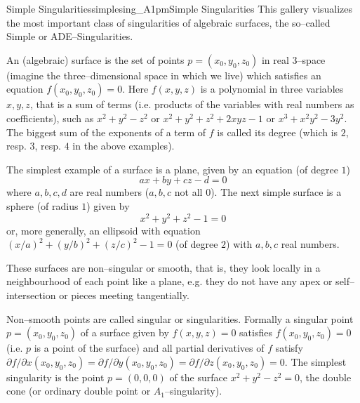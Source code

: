 \begin{surferIntroPage}{Simple Singularities}{simplesing_A1pm}{Simple Singularities}
This gallery visualizes the most important class of singularities of algebraic surfaces, the so--called Simple or ADE--Singularities.

An (algebraic) surface is the set of points $p=(x_0, y_0, z_0)$ in real $3$--space (imagine the three--dimensional space in which we live) which satisfies an equation $f(x_0, y_0, z_0)=0$. Here $f(x,y,z)$ is a polynomial in three variables $x,y,z$, that is a sum of terms (i.e. products of the variables with real numbers as coefficients), such as $x^2+y^2-z^2$ or $x^2+y^2+z^2+2xyz-1$ or $x^3+x^2y^2-3y^2$. The biggest sum of the exponents of a term of $f$ is called its degree (which is $2$, resp. $3$, resp. $4$ in the above examples).

The simplest example of a surface is a plane, given by an equation (of degree $1$)
\[ ax+by+cz-d=0
\]
where $a,b,c,d$ are real numbers ($a, b, c$ not all $0$). The next simple surface is a sphere (of radius $1$) given by
\[
x^2+y^2+z^2-1=0
\]
or, more generally, an ellipsoid with equation $(x/a)^2+(y/b)^2+(z/c)^2-1=0$ (of degree $2$) with $a,b,c$ real numbers.

These surfaces are non--singular or smooth, that is, they look locally in a neighbourhood of each point like a plane, e.g. they do not have any apex or self--intersection or pieces meeting tangentially.

Non--smooth points are called singular or singularities. Formally a singular point $p=(x_0, y_0, z_0)$ of a surface given by $f(x,y,z)=0$ satisfies $f(x_0, y_0, z_0)=0$ (i.e. $p$ is a point of the surface) and all partial derivatives of $f$ satisfy $\partial f/\partial x (x_0, y_0, z_0)=\partial f/\partial y (x_0, y_0, z_0)=\partial f/\partial z(x_0, y_0, z_0)=0$. The simplest singularity is the point $p=(0,0,0)$ of the surface $x^2+y^2-z^2=0$, the double cone (or ordinary double point or $A_1$--singularity).


\end{surferIntroPage}
